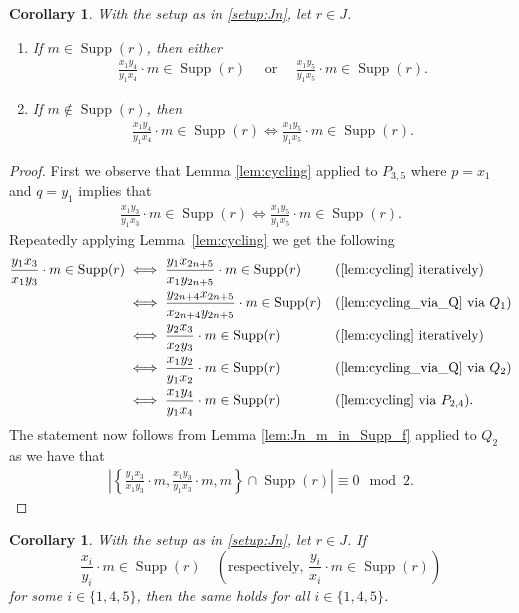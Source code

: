 \documentclass[12pt,a4paper]{amsart}
\theoremstyle{plain}
\newtheorem{cor}[thrm]{Corollary}
\def\bcor{\begin{cor}}
\def\ecor{\end{cor}}
\theoremstyle{definition}
\def\bproof{\begin{proof}}
\def\eproof{\end{proof}}
\theoremstyle{remark}
\DeclareMathOperator{\Supp}{Supp}
\newcommand{\card}[1]{\left \lvert #1 \right\rvert}
\begin{document}
\bcor
\label{cor:Jn_degree_two_monomial_in_Supp}
With the setup as in \ref{setup:Jn}, let $r \in J$. 
\begin{enumerate}
\item If $m \in \Supp(r)$, then either
\begin{align*}
\frac{x_{1}y_{4}}{y_{1}x_{4}} \cdot m \in \Supp(r) \quad \text{ or }  \quad \frac{x_{1}y_{5}}{y_{1}x_{5}} \cdot m \in \Supp(r).
\end{align*}
\item If $m \notin \Supp(r)$, then 
\begin{align*}
    \frac{x_{1}y_{4}}{y_{1}x_{4}} \cdot m \in \Supp(r) \iff \frac{x_{1}y_{5}}{y_{1}x_{5}} \cdot m \in \Supp(r).
\end{align*}
\end{enumerate}
\ecor 

\bproof 
First we observe that Lemma \ref{lem:cycling} applied to $P_{3,5}$ where $p = x_{1}$ and $q = y_{1}$ implies that
\begin{align*}
    \frac{x_{1}y_{3}}{y_{1}x_{3}} \cdot m \in \Supp(r) \iff \frac{x_{1}y_{5}}{y_{1}x_{5}} \cdot m \in \Supp(r).
\end{align*}
Repeatedly applying Lemma~\ref{lem:cycling} we get the following
\begin{align*}
    \frac{y_{1}x_{3}}{x_{1}y_{3}} \cdot m \in \Supp(r)
    &\iff \frac{y_{1}x_{2n+5}}{x_{1}y_{2n+5}} \cdot m \in \Supp(r) & & (\ref{lem:cycling} \text{ iteratively}) \\
    &\iff \frac{y_{2n+4}x_{2n+5}}{x_{2n+4}y_{2n+5}} \cdot m \in \Supp(r) & & (\ref{lem:cycling_via_Q} \text{ via } Q_{1}) \\
    &\iff \frac{y_{2}x_{3}}{x_{2}y_{3}} \cdot m \in \Supp(r) & & (\ref{lem:cycling} \text{ iteratively}) \\
    &\iff \frac{x_{1}y_{2}}{y_{1}x_{2}} \cdot m \in \Supp(r) & & (\ref{lem:cycling_via_Q} \text{ via } Q_{2}) \\
    &\iff \frac{x_{1}y_{4}}{y_{1}x_{4}} \cdot m \in \Supp(r) & & (\ref{lem:cycling} \text{ via } P_{2,4}).
\end{align*}
The statement now follows from Lemma \ref{lem:Jn_m_in_Supp_f} applied to $Q_{2}$ as we have that 
\begin{align*}
    \card { \left\{ \frac{y_{1}x_{3}}{x_{1}y_{3}} \cdot m, \frac{x_{1}y_{3}}{y_{1}x_{3}} \cdot m, m\right \} \cap \Supp(r) } \equiv 0 \mod{2}.
\end{align*}
\eproof


\bcor 
\label{cor:Jn_cycling_xi_by_yi}
With the setup as in \ref{setup:Jn}, let $r \in J$. If 
\begin{equation}
    \label{eqn:Jn_cycling_xi_by_yi_1}
    \frac{x_{i}}{y_{i}} \cdot m \in \Supp(r) \quad  (\text{respectively, } \frac{y_{i}}{x_{i}} \cdot m \in \Supp(r) )
\end{equation}
for some $i \in \{1,4,5\}$, then the same holds for all $i \in \{1,4,5\}$.
\ecor 
\end{document}
